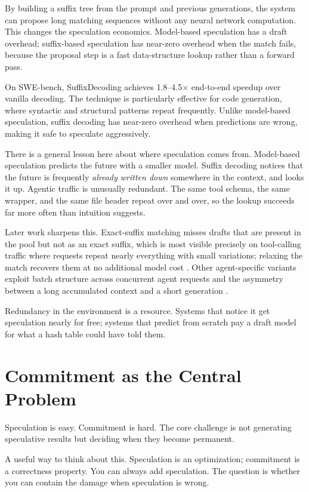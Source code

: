 By building a suffix tree from the prompt and previous generations, the system can propose long matching sequences without any neural network computation. This changes the speculation economics. Model-based speculation has a draft overhead; suffix-based speculation has near-zero overhead when the match fails, because the proposal step is a fast data-structure lookup rather than a forward pass.

On SWE-bench, SuffixDecoding achieves 1.8--4.5$\times$ end-to-end speedup over vanilla decoding. The technique is particularly effective for code generation, where syntactic and structural patterns repeat frequently. Unlike model-based speculation, suffix decoding has near-zero overhead when predictions are wrong, making it safe to speculate aggressively.

There is a general lesson here about where speculation comes from. Model-based speculation predicts the future with a smaller model. Suffix decoding notices that the future is frequently \emph{already written down} somewhere in the context, and looks it up. Agentic traffic is unusually redundant. The same tool schema, the same wrapper, and the same file header repeat over and over, so the lookup succeeds far more often than intuition suggests.

Later work sharpens this. Exact-suffix matching misses drafts that are present in the pool but not as an exact suffix, which is most visible precisely on tool-calling traffic where requests repeat nearly everything with small variations; relaxing the match recovers them at no additional model cost \cite{oilbird2026}. Other agent-specific variants exploit batch structure across concurrent agent requests \cite{agentspec2026} and the asymmetry between a long accumulated context and a short generation \cite{asymspec2026}.

Redundancy in the environment is a resource. Systems that notice it get speculation nearly for free; systems that predict from scratch pay a draft model for what a hash table could have told them.

\section{Commitment as the Central Problem}

Speculation is easy. Commitment is hard. The core challenge is not generating speculative results but deciding when they become permanent.

A useful way to think about this. Speculation is an optimization; commitment is a correctness property. You can always add speculation. The question is whether you can contain the damage when speculation is wrong.

